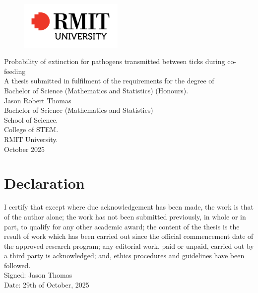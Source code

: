 \documentclass[hidelinks]{article}
\begin{document}
\begin{titlepage}
\begin{figure}[t!]
\centering
\includegraphics[width=5cm]{rmit-logo}
\end{figure}

\vspace*{2cm}

\begin{center}
{\large
	Probability of extinction for pathogens transmitted between ticks during co-feeding\\
	[1cm]
	A thesis submitted in fulfilment of the requirements for the degree of \\
    Bachelor of Science (Mathematics and Statistics) (Honours).\\
	[2cm]
	Jason Robert Thomas\\
	[0.5cm]
	Bachelor of Science (Mathematics and Statistics) \\
	[3cm]
	School of Science.\\
	[0.5cm]
	College of STEM.\\
	[0.5cm]
	RMIT University.\\
	[2cm]
	October 2025\\
}
\end{center}
	
\end{titlepage}

\section*{Declaration}
I certify that except where due acknowledgement has been made, the work is that of the author alone; the work has not been submitted previously, in whole or in part, to qualify for any other academic award; the content of the thesis is the result of work which has been carried out since the official commencement date of the approved research program; any editorial work, paid or unpaid, carried out by a third party is acknowledged; and, ethics procedures and guidelines have been followed. \\
[1cm]
Signed: Jason Thomas\\
[1cm]
Date: 29th of October, 2025\\
\end{document}
